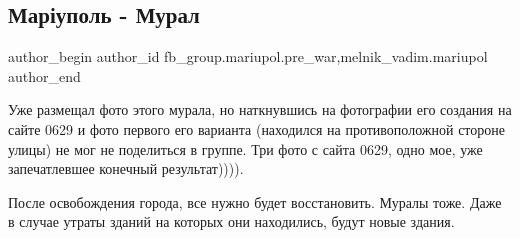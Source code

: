  
 
 
 
 

\subsection{Маріуполь - Мурал}
\label{sec:07_02_2023.fb.fb_group.mariupol.pre_war.1.mar_upol___mural}
 
\ifcmt
 author_begin
   author_id fb_group.mariupol.pre_war,melnik_vadim.mariupol
 author_end
\fi

Уже размещал фото этого мурала, но наткнувшись на фотографии его создания на
сайте 0629 и фото первого его варианта (находился на противоположной стороне
улицы) не мог не поделиться в группе. Три фото с сайта 0629, одно мое, уже
запечатлевшее конечный результат)))).

После освобождения города, все нужно будет восстановить. Муралы тоже. Даже в
случае утраты зданий на которых они находились, будут новые здания.

